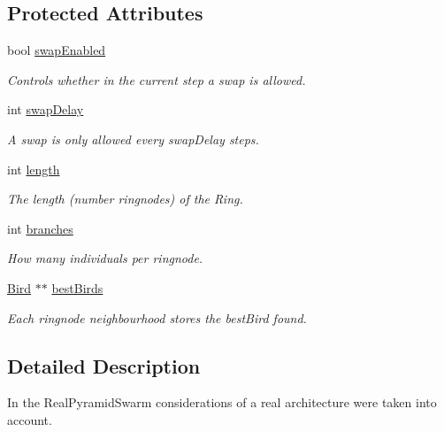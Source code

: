 \subsection*{Protected Attributes}
\begin{CompactItemize}
\item 
bool \hyperlink{classRingSwarm_55b18dac3985e7cca8de7697b32d707a}{swapEnabled}
\begin{CompactList}\small\item\em Controls whether in the current step a swap is allowed. \item\end{CompactList}\item 
int \hyperlink{classRingSwarm_bc6194060dcd54ddfa56ec3b56b15515}{swapDelay}
\begin{CompactList}\small\item\em A swap is only allowed every swapDelay steps. \item\end{CompactList}\item 
int \hyperlink{classRingSwarm_ab4a1218eb2ea7858a4172370f5b51b4}{length}
\begin{CompactList}\small\item\em The length (number ringnodes) of the Ring. \item\end{CompactList}\item 
int \hyperlink{classRingSwarm_f187d6157f05bba9d56617e47afcd11c}{branches}
\begin{CompactList}\small\item\em How many individuals per ringnode. \item\end{CompactList}\item 
\hyperlink{classBird}{Bird} $\ast$$\ast$ \hyperlink{classRingSwarm_91d5d5b8fb3bfcb3e59d0724171fc894}{bestBirds}
\begin{CompactList}\small\item\em Each ringnode neighbourhood stores the bestBird found. \item\end{CompactList}\end{CompactItemize}


\subsection{Detailed Description}
In the RealPyramidSwarm considerations of a real architecture were taken into account. 

